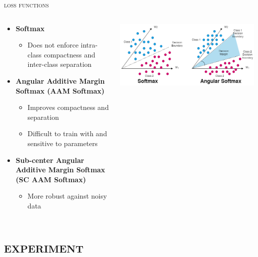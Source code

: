 \documentclass[10pt,aspectratio=1610,professionalfont]{beamer}
\begin{document}
\begin{frame}{\textsc{loss functions}}
    \begin{columns}
		\begin{column}{0.4\textwidth}
		\begin{itemize}
	        \item \textbf{Softmax}
		  \begin{itemize}
	            \item  Does not enforce intra-class compactness and inter-class separation
	        \end{itemize}
		  \item \textbf{Angular Additive Margin Softmax (AAM Softmax)}
		  \begin{itemize}
		      \item Improves compactness and separation
	            \item  Difficult to train with and sensitive to parameters
	        \end{itemize}
		  \item \textbf{Sub-center Angular Additive Margin Softmax (SC AAM Softmax)}
		   \begin{itemize}
	            \item  More robust against noisy data
	        \end{itemize}
	    \end{itemize}
		\end{column}
		\begin{column}{0.6\textwidth} 
		\begin{center}
		     	\includegraphics[width=1.0\textwidth]{img/softmax.png}
		    	\end{center}
		\end{column}
	\end{columns}
    
\end{frame}

\section{\textsc{experiment}}
\end{document}
